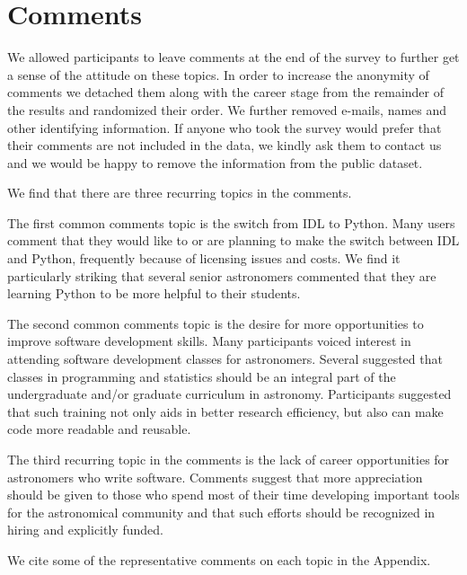 \section{Comments}
\label{sec:comments}

We allowed participants to leave comments at the end of the survey to further get a sense of the attitude on these topics. In order to increase the anonymity of comments we detached them along with the career stage from the remainder of the results and randomized their order. We further removed e-mails, names and other identifying information. If anyone who took the survey would prefer that their comments are not included in the data, we kindly ask them to contact us and we would be happy to remove the information from the public dataset. 

We find that there are three recurring topics in the comments. 

The first common comments topic is the switch from IDL to Python. Many users comment that they would like to or are planning to make the switch between IDL and Python, frequently because of licensing issues and costs. We find it particularly striking that several senior astronomers commented that they are learning Python to be more helpful to their students.

The second common comments topic is the desire for more opportunities to improve software development skills. Many participants voiced interest in attending software development classes for astronomers. Several suggested that classes in programming and statistics should be an integral part of the undergraduate and/or graduate curriculum in astronomy. Participants suggested that such training not only aids in better research efficiency, but also can make code more readable and reusable. 

The third recurring topic in the comments is the lack of career opportunities for astronomers who write software. Comments suggest that more appreciation should be given to those who spend most of their time developing important tools for the astronomical community and that such efforts should be recognized in hiring and explicitly funded. 

We cite some of the representative comments on each topic in the Appendix.
